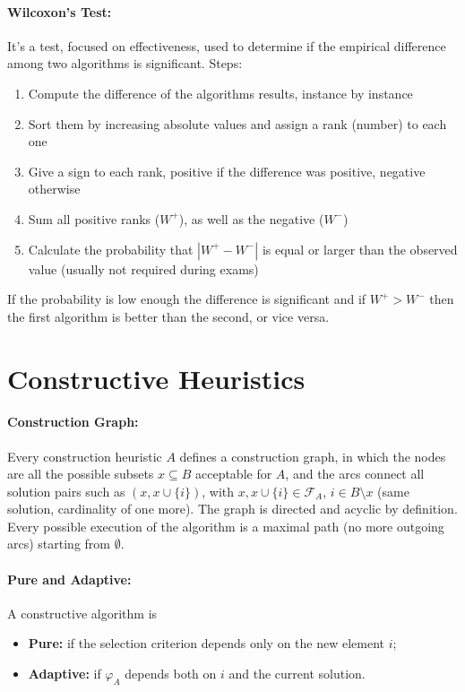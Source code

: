 \documentclass{article}
\begin{document}
	\paragraph{Wilcoxon's Test:} It's a test, focused on effectiveness, used to determine if the empirical difference among two algorithms is significant. Steps:
	\begin{enumerate}
		\item Compute the difference of the algorithms results, instance by instance
		\item Sort them by increasing absolute values and assign a rank (number) to each one
		\item Give a sign to each rank, positive if the difference was positive, negative otherwise
		\item Sum all positive ranks ($W^+$), as well as the negative ($W^-$)
		\item Calculate the probability that $|W^+ - W^-|$ is equal or larger than the observed value (usually not required during exams)
	\end{enumerate}
	If the probability is low enough the difference is significant and if $W^+ > W^-$ then the first algorithm is better than the second, or vice versa.\\
	
	\section*{Constructive Heuristics}
	
	\paragraph{Construction Graph:} Every construction heuristic $A$ defines a construction graph, in which the nodes are all the possible subsets $x \subseteq B$ acceptable for $A$, and the arcs connect all solution pairs such as $(x, x \cup \{i\})$, with $x, x \cup \{i\} \in \mathcal{F}_A$, $i \in B \setminus x$ (same solution, cardinality of one more). The graph is directed and acyclic by definition. Every possible execution of the algorithm is a maximal path (no more outgoing arcs) starting from $\emptyset$.\\
	
	\paragraph{Pure and Adaptive:} A constructive algorithm is 
	\begin{itemize}
		\item \textbf{Pure:} if the selection criterion depends only on the new element $i$;
		\item \textbf{Adaptive:} if $\varphi_A$ depends both on $i$ and the current solution.\\
	\end{itemize}
	
\end{document}
